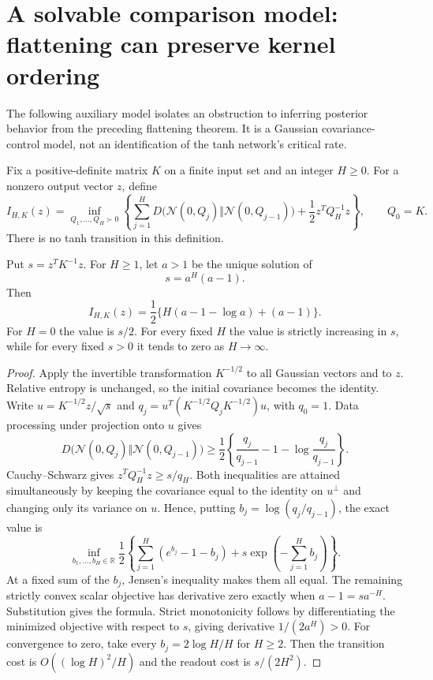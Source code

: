 \section{A solvable comparison model: flattening can preserve kernel ordering}
\label{sec:linear-control-comparison}

The following auxiliary model isolates an obstruction to inferring
posterior behavior from the preceding flattening theorem. It is a
Gaussian covariance-control model, not an identification of the tanh
network's critical rate.

Fix a positive-definite matrix $K$ on a finite input set and an integer
$H\ge0$. For a nonzero output vector $z$, define
\[
 I_{H,K}(z)=\inf_{Q_1,\ldots,Q_H\succ0}
 \left\{\sum_{j=1}^H D\bigl(\mathcal N(0,Q_j)
                  \Vert\mathcal N(0,Q_{j-1})\bigr)
           +\frac12z^TQ_H^{-1}z\right\},\qquad Q_0=K.
\]
There is no tanh transition in this definition.

\begin{proposition}
\label{prop:linear-control-value}
Put $s=z^TK^{-1}z$. For $H\ge1$, let $a>1$ be the unique solution of
\[
 s=a^H(a-1).
\]
Then
\[
 I_{H,K}(z)=\frac12\{H(a-1-\log a)+(a-1)\}.
\]
For $H=0$ the value is $s/2$. For every fixed $H$ the value is strictly
increasing in $s$, while for every fixed $s>0$ it tends to zero as
$H\to\infty$.
\end{proposition}

\begin{proof}
Apply the invertible transformation $K^{-1/2}$ to all Gaussian vectors
and to $z$. Relative entropy is unchanged, so the initial covariance
becomes the identity. Write $u=K^{-1/2}z/\sqrt{s}$ and
$q_j=u^T(K^{-1/2}Q_jK^{-1/2})u$, with $q_0=1$.
Data processing under projection onto $u$ gives
\[
 D\bigl(\mathcal N(0,Q_j)\Vert\mathcal N(0,Q_{j-1})\bigr)
 \ge\frac12\left\{\frac{q_j}{q_{j-1}}-1
                     -\log\frac{q_j}{q_{j-1}}\right\}.
\]
Cauchy--Schwarz gives $z^TQ_H^{-1}z\ge s/q_H$.
Both inequalities are attained simultaneously by keeping the covariance
equal to the identity on $u^\perp$ and changing only its variance on
$u$. Hence, putting $b_j=\log(q_j/q_{j-1})$, the exact value is
\[
 \inf_{b_1,\ldots,b_H\in\mathbb R}
 \frac12\left\{\sum_{j=1}^H(e^{b_j}-1-b_j)
                    +s\exp\left(-\sum_{j=1}^H b_j\right)\right\}.
\]
At a fixed sum of the $b_j$, Jensen's inequality makes them all equal.
The remaining strictly convex scalar objective has derivative zero
exactly when $a-1=s a^{-H}$. Substitution gives the formula.
Strict monotonicity follows by differentiating the minimized objective
with respect to $s$, giving derivative $1/(2a^H)>0$.
For convergence to zero, take every $b_j=2\log H/H$ for $H\ge2$.
Then the transition cost is $O((\log H)^2/H)$ and the readout cost is
$s/(2H^2)$.
\end{proof}

